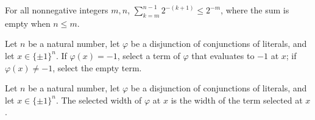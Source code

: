 \begin{theorem}
\label{FABL.sum_inverse_two_pow_succ_Ico_le}
\leanok
{}
For all nonnegative integers $m,n$, $\sum_{k=m}^{n-1}2^{-(k+1)}\le 2^{-m}$, where the
sum is empty when $n\le m$.
\end{theorem}

\begin{definition}
\label{FABL.DNFFormula.selectedTerm}
\leanok
{}
Let $n$ be a natural number, let $\varphi$ be a disjunction of conjunctions of
literals, and let $x\in\{\pm1\}^n$. If $\varphi(x)=-1$, select a term of $\varphi$
that evaluates to $-1$ at $x$; if $\varphi(x)\ne-1$, select the empty term.
\end{definition}

\begin{definition}
\label{FABL.DNFFormula.selectedWidth}
\leanok
{}
Let $n$ be a natural number, let $\varphi$ be a disjunction of conjunctions of
literals, and let $x\in\{\pm1\}^n$. The selected width of $\varphi$ at $x$ is the
width of the term selected at $x$.
\end{definition}

